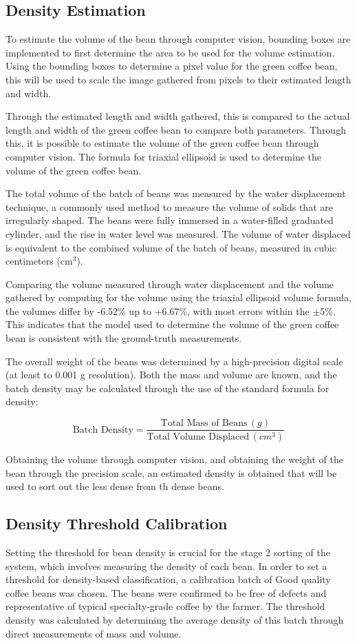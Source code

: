 \subsection{Density Estimation}
To estimate the volume of the bean through computer vision, bounding boxes are implemented to first determine the area to be used for the volume estimation. Using the bounding boxes to determine a pixel value for the green coffee bean, this will be used to scale the image gathered from pixels to their estimated length and width. 

Through the estimated length and width gathered, this is compared to the actual length and width of the green coffee bean to compare both parameters. Through this, it is possible to estimate the volume of the green coffee bean through computer vision. The formula for triaxial ellipsoid is used to determine the volume of the green coffee bean.

The total volume of the batch of beans was measured by the water displacement technique, a commonly used method to measure the volume of solids that are irregularly shaped. The beans were fully immersed in a water-filled graduated cylinder, and the rise in water level was measured. The volume of water displaced is equivalent to the combined volume of the batch of beans, measured in cubic centimeters (cm$^3$).

Comparing the volume measured through water displacement and the volume gathered by computing for the volume using the triaxial ellipsoid volume formula, the volumes differ by -6.52\% up to +6.67\%, with most errors within the $\pm$5\%. This indicates that the model used to determine the volume of the green coffee bean is consistent with the ground-truth measurements. 


The overall weight of the beans was determined by a high-precision digital scale (at least to 0.001 g resolution). Both the mass and volume are known, and the batch density may be calculated through the use of the standard formula for density:

\[
\text{Batch Density} = \frac{\text{Total Mass of Beans} \, (g)}{\text{Total Volume Displaced} \, (cm^3)}
\]

Obtaining the volume through computer vision, and obtaining the weight of the bean through the precision scale, an estimated density is obtained that will be used to sort out the less dense from th dense beans. 

\subsection{Density Threshold Calibration}
\label{sec:density_threshold_calibration}
Setting the threshold for bean density is crucial for the stage 2 sorting of the system, which involves measuring the density of each bean. In order to set a threshold for density-based classification, a calibration batch of Good quality coffee beans was chosen. The beans were confirmed to be free of defects and representative of typical specialty-grade coffee by the farmer. The threshold density was calculated by determining the average density of this batch through direct measurements of mass and volume.

